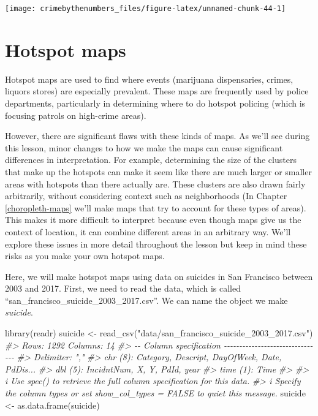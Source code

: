 \documentclass[
]{krantz}
\makeatletter
\newenvironment{Shaded}{\begin{snugshade}}{\end{snugshade}}
\newcommand{\CommentTok}[1]{\textcolor[rgb]{0.37,0.37,0.37}{\textit{#1}}}
\newcommand{\FunctionTok}[1]{\textcolor[rgb]{0,0,0}{#1}}
\newcommand{\NormalTok}[1]{#1}
\newcommand{\OtherTok}[1]{\textcolor[rgb]{0.37,0.37,0.37}{#1}}
\newcommand{\StringTok}[1]{\textcolor[rgb]{0.5,0.5,0.5}{#1}}
\newenvironment{kframe}{%
\medskip{}
\setlength{\fboxsep}{.8em}
 \def\at@end@of@kframe{}%
 \ifinner\ifhmode%
  \def\at@end@of@kframe{\end{minipage}}%
  \begin{minipage}{\columnwidth}%
 \fi\fi%
 \def\FrameCommand##1{\hskip\@totalleftmargin \hskip-\fboxsep
 \colorbox{shadecolor}{##1}\hskip-\fboxsep
     \hskip-\linewidth \hskip-\@totalleftmargin \hskip\columnwidth}%
 \MakeFramed {\advance\hsize-\width
   \@totalleftmargin\z@ \linewidth\hsize
   \@setminipage}}%
 {\par\unskip\endMakeFramed%
 \at@end@of@kframe}
\renewenvironment{Shaded}{\begin{kframe}}{\end{kframe}}
\makeatother
\begin{document}
\begin{center}\texttt{[image: crimebythenumbers\_files/figure-latex/unnamed-chunk-44-1]} \end{center}

\hypertarget{hotspot-maps}{%
\chapter{Hotspot maps}\label{hotspot-maps}}

Hotspot maps are used to find where events (marijuana dispensaries, crimes, liquors stores) are especially prevalent. These maps are frequently used by police departments, particularly in determining where to do hotspot policing (which is focusing patrols on high-crime areas).

However, there are significant flaws with these kinds of maps. As we'll see during this lesson, minor changes to how we make the maps can cause significant differences in interpretation. For example, determining the size of the clusters that make up the hotspots can make it seem like there are much larger or smaller areas with hotspots than there actually are. These clusters are also drawn fairly arbitrarily, without considering context such as neighborhoods (In Chapter \ref{choropleth-maps} we'll make maps that try to account for these types of areas). This makes it more difficult to interpret because even though maps give us the context of location, it can combine different areas in an arbitrary way. We'll explore these issues in more detail throughout the lesson but keep in mind these risks as you make your own hotspot maps.

Here, we will make hotspot maps using data on suicides in San Francisco between 2003 and 2017. First, we need to read the data, which is called ``san\_francisco\_suicide\_2003\_2017.csv''. We can name the object we make \emph{suicide}.

\begin{Shaded}
\begin{Highlighting}[]
\FunctionTok{library}\NormalTok{(readr)}
\NormalTok{suicide }\OtherTok{\textless{}{-}} \FunctionTok{read\_csv}\NormalTok{(}\StringTok{"data/san\_francisco\_suicide\_2003\_2017.csv"}\NormalTok{)}
\CommentTok{\#\textgreater{} Rows: 1292 Columns: 14}
\CommentTok{\#\textgreater{} {-}{-} Column specification {-}{-}{-}{-}{-}{-}{-}{-}{-}{-}{-}{-}{-}{-}{-}{-}{-}{-}{-}{-}{-}{-}{-}{-}{-}{-}{-}{-}{-}{-}{-}{-}}
\CommentTok{\#\textgreater{} Delimiter: ","}
\CommentTok{\#\textgreater{} chr  (8): Category, Descript, DayOfWeek, Date, PdDis...}
\CommentTok{\#\textgreater{} dbl  (5): IncidntNum, X, Y, PdId, year}
\CommentTok{\#\textgreater{} time (1): Time}
\CommentTok{\#\textgreater{} }
\CommentTok{\#\textgreater{} i Use \textasciigrave{}spec()\textasciigrave{} to retrieve the full column specification for this data.}
\CommentTok{\#\textgreater{} i Specify the column types or set \textasciigrave{}show\_col\_types = FALSE\textasciigrave{} to quiet this message.}
\NormalTok{suicide }\OtherTok{\textless{}{-}} \FunctionTok{as.data.frame}\NormalTok{(suicide)}
\end{Highlighting}
\end{Shaded}
\end{document}
